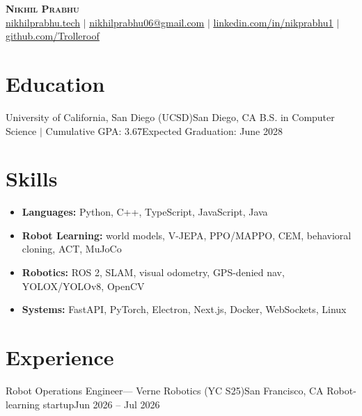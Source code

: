 




\begin{center}
    \textbf{\Large \scshape Nikhil Prabhu} \\ \vspace{1pt}
    \small \href{https://nikhilprabhu.tech}{\underline{nikhilprabhu.tech}} $|$
    \href{mailto:nikhilprabhu06@gmail.com}{\underline{nikhilprabhu06@gmail.com}} $|$
    \href{https://www.linkedin.com/in/nikprabhu1/}{\underline{linkedin.com/in/nikprabhu1}} $|$
    \href{https://github.com/Trolleroof}{\underline{github.com/Trolleroof}}
\end{center}
\small

\section{Education}
  \resumeSubHeadingListStart
    \resumeSubheading
      {University of California, San Diego (UCSD)}{San Diego, CA}
      {B.S. in Computer Science $|$ Cumulative GPA: 3.67}{Expected Graduation: June 2028}
  \resumeSubHeadingListEnd
\vspace{-4pt}

\section{Skills}
\begin{itemize}[leftmargin=0.15in, label={}, nosep, topsep=2pt, itemsep=3pt, parsep=0pt]
  \item \textbf{Languages:} Python, C++, TypeScript, JavaScript, Java
  \item \textbf{Robot Learning:} world models, V-JEPA, PPO/MAPPO, CEM, behavioral cloning, ACT, MuJoCo
  \item \textbf{Robotics:} ROS 2, SLAM, visual odometry, GPS-denied nav, YOLOX/YOLOv8, OpenCV
  \item \textbf{Systems:} FastAPI, PyTorch, Electron, Next.js, Docker, WebSockets, Linux
\end{itemize}
\vspace{-4pt}

\section{Experience}
  \resumeSubHeadingListStart

    \resumeSubheading
      {Robot Operations Engineer--- Verne Robotics (YC S25)}{San Francisco, CA}
      {Robot-learning startup}{Jun 2026 -- Jul 2026}
      \resumeItemListStart
      \resumeItemListEnd


